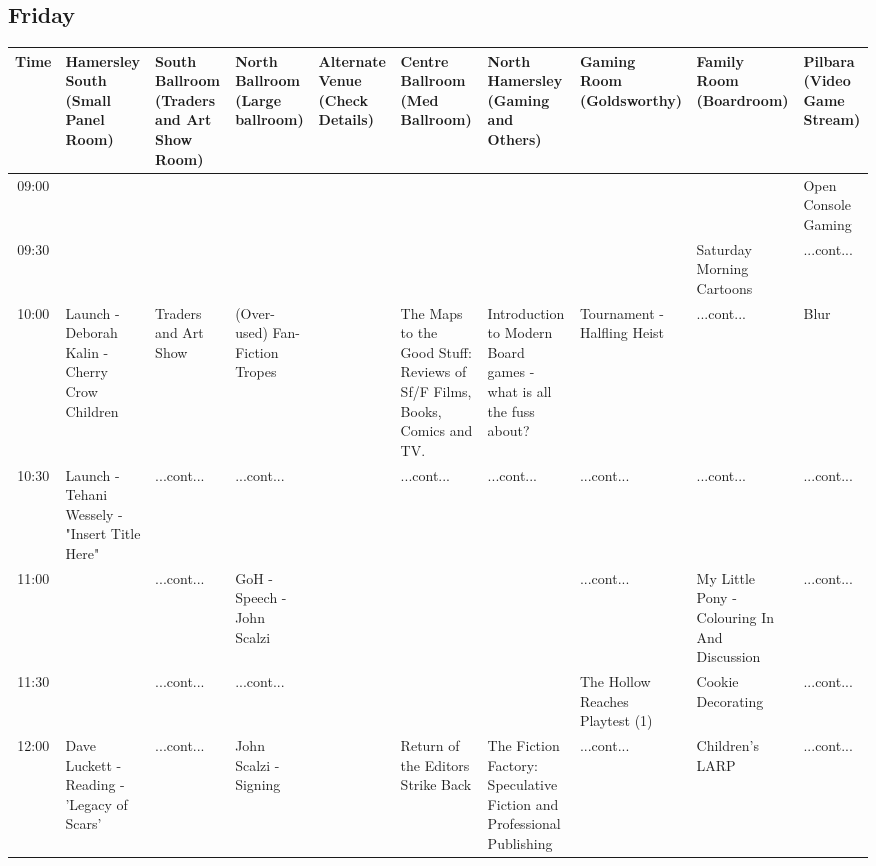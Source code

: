 \documentclass{scrreprt}
\begin{document}
\begin{landscape}
\subsection*{Friday}\tiny
\begin{tabular}{c||p{25mm}|p{25mm}|p{25mm}|p{25mm}|p{25mm}|p{25mm}|p{25mm}|p{25mm}|p{25mm}|}
Time&Hamersley South (Small Panel Room)&South Ballroom (Traders and Art Show Room)&North Ballroom (Large ballroom)&Alternate Venue (Check Details)&Centre Ballroom (Med Ballroom)&North Hamersley (Gaming and Others)&Gaming Room (Goldsworthy)&Family Room (Boardroom)&Pilbara (Video Game Stream)\\
\hline
\hline
09:00&&&&&&&&&\cellcolor[gray]{0.928485} Open Console Gaming\\
09:30&&&&&&&&\cellcolor[gray]{0.791679} Saturday Morning Cartoons&\cellcolor[gray]{0.928485} ...cont...\\
10:00&\cellcolor[gray]{0.865680} Launch - Deborah Kalin - Cherry Crow Children&\cellcolor[gray]{0.619790} Traders and Art Show&\cellcolor[gray]{0.659211} (Over-used) Fan-Fiction Tropes&&\cellcolor[gray]{0.815096} The Maps to the Good Stuff: Reviews of Sf/F Films, Books, Comics and TV.&\cellcolor[gray]{0.702879} Introduction to Modern Board games - what is all the fuss about?&\cellcolor[gray]{0.559916} Tournament - Halfling Heist&\cellcolor[gray]{0.791679} ...cont...&\cellcolor[gray]{0.679616} Blur\\
10:30&\cellcolor[gray]{0.940953} Launch - Tehani Wessely - "Insert Title Here"&\cellcolor[gray]{0.619790} ...cont...&\cellcolor[gray]{0.659211} ...cont...&&\cellcolor[gray]{0.815096} ...cont...&\cellcolor[gray]{0.702879} ...cont...&\cellcolor[gray]{0.559916} ...cont...&\cellcolor[gray]{0.791679} ...cont...&\cellcolor[gray]{0.679616} ...cont...\\
11:00&&\cellcolor[gray]{0.619790} ...cont...&\cellcolor[gray]{0.762015} GoH - Speech - John Scalzi&&&&\cellcolor[gray]{0.559916} ...cont...&\cellcolor[gray]{0.789125} My Little Pony - Colouring In And Discussion&\cellcolor[gray]{0.679616} ...cont...\\
11:30&&\cellcolor[gray]{0.619790} ...cont...&\cellcolor[gray]{0.762015} ...cont...&&&&\cellcolor[gray]{0.654284} The Hollow Reaches Playtest (1)&\cellcolor[gray]{0.956968} Cookie Decorating&\cellcolor[gray]{0.679616} ...cont...\\
12:00&\cellcolor[gray]{0.696273} Dave Luckett - Reading - 'Legacy of Scars'&\cellcolor[gray]{0.619790} ...cont...&\cellcolor[gray]{0.825010} John Scalzi - Signing&&\cellcolor[gray]{0.688326} Return of the Editors Strike Back&\cellcolor[gray]{0.789003} The Fiction Factory: Speculative Fiction and Professional Publishing&\cellcolor[gray]{0.654284} ...cont...&\cellcolor[gray]{0.703331} Children's LARP&\cellcolor[gray]{0.679616} ...cont...\\

\end{tabular}
\end{landscape}
\end{document}
